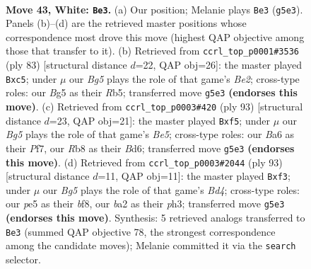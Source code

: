 \documentclass[11pt]{article}
\begin{document}
\clearpage

\begin{figure}[p]\centering
\begin{subfigure}{0.46\textwidth}\centering
\resizebox{\linewidth}{!}{%
\newchessgame
\chessboard[
  setfen={1R6/6k1/B7/4p1B1/3r3p/5p1P/b4P1K/8 w - - 14 43},
  showmover=false,
  pgfstyle=straightmove, color=movearrow, markmove={g5-e3}
]}
\caption{}
\end{subfigure}\hfill
\begin{subfigure}{0.46\textwidth}\centering
\resizebox{\linewidth}{!}{%
\newchessgame
\chessboard[
  setfen={8/p3b3/8/1rPk3p/5R2/2B1PP2/8/5K2 b - - 0 42},
  showmover=false,
  pgfstyle=straightmove, color=movearrow, markmove={e7-c5}
]}
\caption{}
\end{subfigure}
\\[4pt]
\begin{subfigure}{0.46\textwidth}\centering
\resizebox{\linewidth}{!}{%
\newchessgame
\chessboard[
  setfen={8/5p2/3b1p1k/5P2/p1KPb3/P6P/8/6R1 b - - 7 47},
  showmover=false,
  pgfstyle=straightmove, color=movearrow, markmove={e4-f5}
]}
\caption{}
\end{subfigure}\hfill
\begin{subfigure}{0.46\textwidth}\centering
\resizebox{\linewidth}{!}{%
\newchessgame
\chessboard[
  setfen={5B2/8/6R1/1k1b3p/p7/P4P1P/4r3/6K1 b - - 0 47},
  showmover=false,
  pgfstyle=straightmove, color=movearrow, markmove={d5-f3}
]}
\caption{}
\end{subfigure}
\caption{\textbf{Move 43, White: \texttt{Be3}.} (a) Our position; Melanie plays \texttt{Be3} (\texttt{g5e3}). Panels (b)--(d) are the retrieved master positions whose correspondence most drove this move (highest QAP objective among those that transfer to it). (b) Retrieved from \texttt{ccrl\_top\_p0001\#3536} (ply 83) [structural distance $d$=22, QAP obj=26]: the master played \texttt{Bxc5}; under $\mu$ our \emph{Bg5} plays the role of that game's \emph{Be2}; cross-type roles: our \emph{B}g5 as their \emph{R}b5; transferred move \texttt{g5e3} \textbf{(endorses this move)}. (c) Retrieved from \texttt{ccrl\_top\_p0003\#420} (ply 93) [structural distance $d$=23, QAP obj=21]: the master played \texttt{Bxf5}; under $\mu$ our \emph{Bg5} plays the role of that game's \emph{Be5}; cross-type roles: our \emph{B}a6 as their \emph{P}f7, our \emph{R}b8 as their \emph{B}d6; transferred move \texttt{g5e3} \textbf{(endorses this move)}. (d) Retrieved from \texttt{ccrl\_top\_p0003\#2044} (ply 93) [structural distance $d$=11, QAP obj=11]: the master played \texttt{Bxf3}; under $\mu$ our \emph{Bg5} plays the role of that game's \emph{Bd4}; cross-type roles: our \emph{p}e5 as their \emph{b}f8, our \emph{b}a2 as their \emph{p}h3; transferred move \texttt{g5e3} \textbf{(endorses this move)}. Synthesis: 5 retrieved analogs transferred to \texttt{Be3} (summed QAP objective 78, the strongest correspondence among the candidate moves); Melanie committed it via the \texttt{search} selector.}
\label{fig:thought-m84}
\end{figure}
\end{document}
